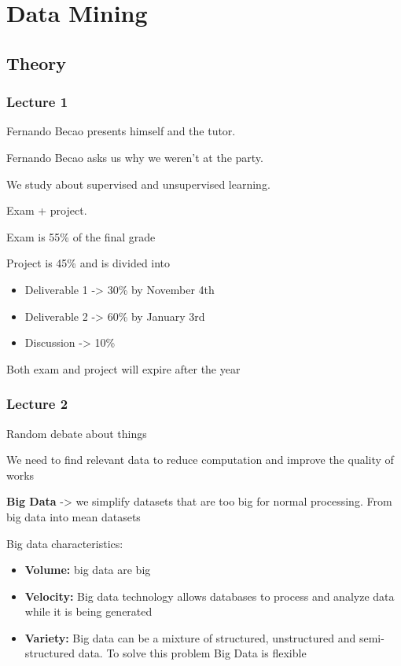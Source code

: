 \section{Data Mining}
\subsection{Theory}

\subsubsection{Lecture 1}

Fernando Becao presents himself and the tutor.

Fernando Becao asks us why we weren't at the party.

We study about supervised and unsupervised learning.

Exam + project.

Exam is 55\% of the final grade

Project is 45\% and is divided into

\begin{itemize}

\item Deliverable 1 -> 30\% by November 4th
\item Deliverable 2 -> 60\% by January 3rd
\item Discussion -> 10\%
\end{itemize}

Both exam and project will expire after the year


\subsubsection{Lecture 2}

Random debate about things

We need to find relevant data to reduce computation and improve the quality of works

\vspace{10pt}

\textbf{Big Data} -> we simplify datasets that are too big for normal processing. From big data into mean datasets

Big data characteristics:
\begin{itemize}
    \item \textbf{Volume:} big data are big
    \item \textbf{Velocity:} Big data technology allows databases to process and analyze data while it is being generated
    \item \textbf{Variety:} Big data can be a mixture of structured, unstructured and semi-structured data. To solve this problem Big Data is flexible
\end{itemize}

